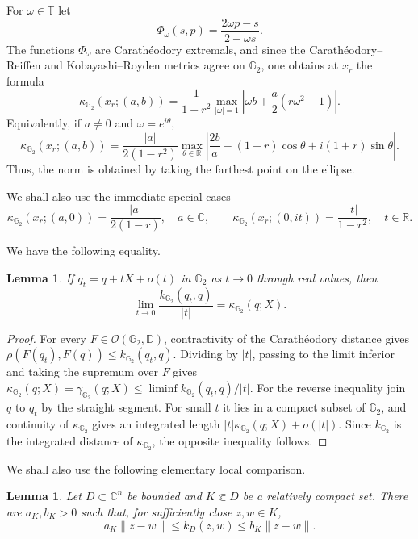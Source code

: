 \documentclass[12pt]{amsart}
\newcommand{\DD}{\mathbb D}
\newcommand{\CC}{\mathbb C}
\newcommand{\RR}{\mathbb R}
\newcommand{\GG}{\mathbb G_2}
\newtheorem{lemma}[theorem]{Lemma}
\begin{document}
For $\omega\in\mathbb T$ let
\[
 \Phi_\omega(s,p)=\frac{2\omega p-s}{2-\omega s}.
\]
The functions $\Phi_\omega$ are Carath\'eodory extremals, and since the
Carath\'eodory--Reiffen and Kobayashi--Royden metrics agree on $\GG$, one obtains
at $x_r$ the formula
\begin{equation}\label{eq:kappa-max}
 \kappa_{\GG}(x_r;(a,b))
 =\frac1{1-r^2}\max_{|\omega|=1}
 \left|\omega b+\frac a2(r\omega^2-1)\right|.
\end{equation}
Equivalently, if $a\ne0$ and $\omega=e^{i\theta}$,
\begin{equation}\label{eq:ellipse}
 \kappa_{\GG}(x_r;(a,b))
 =\frac{|a|}{2(1-r^2)}\max_{\theta\in\RR}
 \left|\frac{2b}{a}-(1-r)\cos\theta+i(1+r)\sin\theta\right|.
\end{equation}
Thus, the norm is obtained by taking the farthest point on the ellipse.

We shall
also use the immediate special cases
\begin{equation}\label{eq:axes}
 \kappa_{\GG}(x_r;(a,0))=\frac{|a|}{2(1-r)},\quad a\in\CC,\qquad
 \kappa_{\GG}(x_r;(0,it))=\frac{|t|}{1-r^2},\quad t\in\RR.
\end{equation}

We have the following equality.
\begin{lemma}\label{lem:metric-derivative}
If $q_t=q+tX+o(t)$ in $\GG$ as $t\to0$ through real values, then
\[
 \lim_{t\to0}\frac{k_{\GG}(q_t,q)}{|t|}=\kappa_{\GG}(q;X).
\]
\end{lemma}

\begin{proof}
For every $F\in\mathcal O(\GG,\DD)$, contractivity of the Carath\'eodory
distance gives
$\rho(F(q_t),F(q))\le k_{\GG}(q_t,q)$.  Dividing by $|t|$, passing to the
limit inferior and taking the supremum over $F$ gives
$\kappa_{\GG}(q;X)=\gamma_{\GG}(q;X)\le\liminf k_{\GG}(q_t,q)/|t|$.
For the reverse inequality join $q$ to $q_t$ by the straight segment.  For
small $t$ it lies in a compact subset of $\GG$, and continuity of
$\kappa_{\GG}$ gives an integrated length
$|t|\kappa_{\GG}(q;X)+o(|t|)$.  Since $k_{\GG}$ is the integrated distance of
$\kappa_{\GG}$, the opposite inequality follows.
\end{proof}

We shall also use the following elementary local comparison.

\begin{lemma}\label{lem:comparison}
Let $D\subset\CC^n$ be bounded and $K\Subset D$ be a relatively compact set.  There are $a_K,b_K>0$ such that, for sufficiently close $z,w\in K$,
\[
 a_K\|z-w\|\le k_D(z,w)\le b_K\|z-w\|.
\]
\end{lemma}
\end{document}
